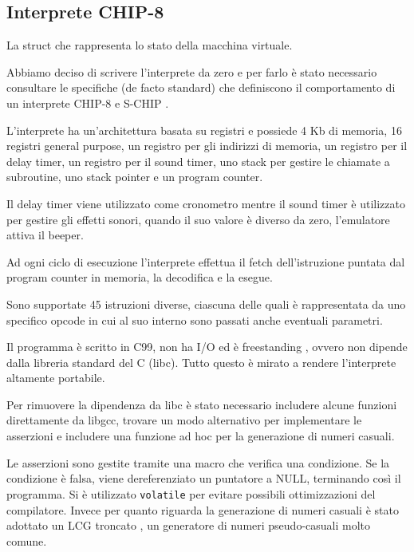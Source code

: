 \documentclass[a4paper]{article}
\begin{document}
\subsection{Interprete CHIP-8} \label{subsec:intreprete}

\begin{Listing}[h!t] %
    \centering
    \caption{La struct che rappresenta lo stato della macchina virtuale.}
    \label{chip8_struct}
\end{Listing}

Abbiamo deciso di scrivere l'interprete da zero e per farlo è stato necessario consultare
le specifiche (de facto standard) che definiscono il comportamento di un interprete CHIP-8
\cite{cowgod:chip8} e S-CHIP \cite{cowgod:schip}.

L'interprete ha un'architettura basata su registri e possiede 4 Kb di memoria, 16 registri
general purpose, un registro per gli indirizzi di memoria, un registro per il delay timer,
un registro per il sound timer, uno stack per gestire le chiamate a subroutine, uno stack pointer
e un program counter.

Il delay timer viene utilizzato come cronometro mentre il sound
timer è utilizzato per gestire gli effetti sonori, quando il suo
valore è diverso da zero, l'emulatore attiva il beeper.

Ad ogni ciclo di esecuzione l'interprete effettua il fetch
dell'istruzione puntata dal program counter in memoria,
la decodifica e la esegue.

Sono supportate 45 istruzioni diverse, ciascuna delle
quali è rappresentata da uno specifico opcode in cui al suo interno
sono passati anche eventuali parametri.

Il programma è scritto in C99, non ha I/O ed è freestanding
\cite{n1256:conformance}, ovvero non dipende dalla libreria
standard del C (libc). Tutto questo è mirato a rendere l'interprete
altamente portabile.

Per rimuovere la dipendenza da libc è stato necessario includere
alcune funzioni direttamente da libgcc, trovare un modo alternativo
per implementare le asserzioni e includere una funzione ad hoc per
la generazione di numeri casuali.

Le asserzioni sono gestite tramite una macro che verifica una condizione.
Se la condizione è falsa, viene dereferenziato un puntatore a NULL, terminando
così il programma. Si è utilizzato \texttt{volatile} per evitare possibili ottimizzazioni
del compilatore. Invece per quanto riguarda la generazione di numeri casuali è stato
adottato un LCG troncato \cite{wikipedia:lcg}, un generatore di numeri pseudo-casuali
molto comune.
\end{document}
